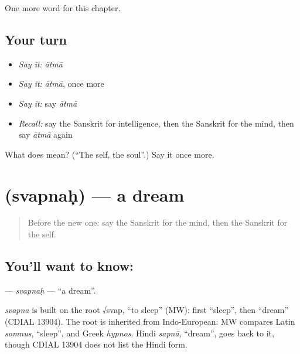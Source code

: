 \begin{grammarlens}[title={What you've built}]
One more word for this chapter.
\end{grammarlens}

\subsection*{Your turn}
\begin{itemize}
\raggedright
  \item \emph{Say it:} \emph{ātmā}
  \item \emph{Say it:} \emph{ātmā}, once more
  \item \emph{Say it:} say \emph{ātmā}
  \item \emph{Recall:} say the Sanskrit for intelligence, then the Sanskrit for the mind, then say \emph{ātmā} again
\end{itemize}

\begin{tcolorbox}[breakable,colback=teal!4,colframe=teal!35!black,title={Before you move on}]
What does  mean? (\textquotedblleft{}The self, the soul\textquotedblright{}.) Say it once more.
\end{tcolorbox}
\section[\texorpdfstring{\sk{स्वप्नः} (svapnaḥ)}{स्वप्नः (svapnaḥ)}]{ (svapnaḥ) — a dream}

\label{lesson:SA-C212-svapnah}



\begin{quote}
Before the new one: say the Sanskrit for the mind, then the Sanskrit for the self.
\end{quote}

\subsection*{You'll want to know: }
\textbf{} — \emph{svapnaḥ} — \textquotedblleft{}a dream\textquotedblright{}.

\begin{cousinweb}
\emph{svapna} is built on the root √svap, \textquotedblleft{}to sleep\textquotedblright{} (MW): first \textquotedblleft{}sleep\textquotedblright{}, then \textquotedblleft{}dream\textquotedblright{} (CDIAL 13904). The root is inherited from Indo-European: MW compares Latin \emph{somnus}, \textquotedblleft{}sleep\textquotedblright{}, and Greek \emph{hypnos}. Hindi \emph{sapnā}, \textquotedblleft{}dream\textquotedblright{}, goes back to it, though CDIAL 13904 does not list the Hindi form.
\end{cousinweb}


